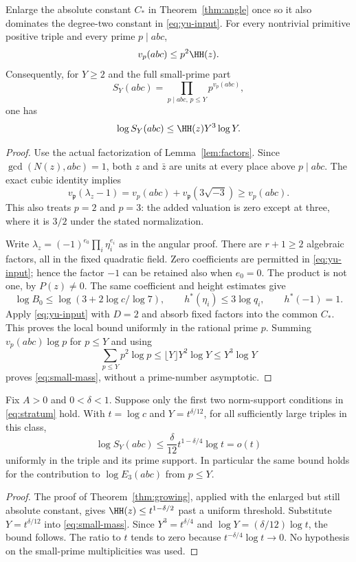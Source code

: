 \begin{theorem}\label{thm:adic-local}
Enlarge the absolute constant $C_*$ in Theorem~\ref{thm:angle} once so it also dominates the degree-two constant in \eqref{eq:yu-input}. For every nontrivial primitive positive triple and every prime $p\mid abc$,
\[
 v_p(abc)\le p^2\HH(z).
\]
Consequently, for $Y\ge2$ and the full small-prime part
\[
 S_Y(abc)=\prod_{p\mid abc,\,p\le Y}p^{v_p(abc)},
\]
one has
\begin{equation}\label{eq:small-mass}
 \log S_Y(abc)\le \HH(z)Y^3\log Y.
\end{equation}
\end{theorem}
\begin{proof}
Use the actual factorization of Lemma~\ref{lem:factors}. Since $\gcd(N(z),abc)=1$, both $z$ and $\bar z$ are units at every place above $p\mid abc$. The exact cubic identity implies
\[
 v_{\mathfrak p}(\lambda_z-1)
  =v_p(abc)+v_{\mathfrak p}(3\sqrt{-3})
  \ge v_p(abc).
\]
This also treats $p=2$ and $p=3$: the added valuation is zero except at three, where it is $3/2$ under the stated normalization.

Write $\lambda_z=(-1)^{e_0}\prod_i\eta_i^{e_i}$ as in the angular proof. There are $r+1\ge2$ algebraic factors, all in the fixed quadratic field. Zero coefficients are permitted in \eqref{eq:yu-input}; hence the factor $-1$ can be retained also when $e_0=0$. The product is not one, by $P(z)\ne0$. The same coefficient and height estimates give
\[
 \log B_0\le\log(3+2\log c/\log7),\qquad
 h^*(\eta_i)\le3\log q_i,\qquad h^*(-1)=1.
\]
Apply \eqref{eq:yu-input} with $D=2$ and absorb fixed factors into the common $C_*$. This proves the local bound uniformly in the rational prime $p$. Summing $v_p(abc)\log p$ for $p\le Y$ and using
\[
 \sum_{p\le Y}p^2\log p\le \lfloor Y\rfloor Y^2\log Y\le Y^3\log Y
\]
proves \eqref{eq:small-mass}, without a prime-number asymptotic.
\end{proof}

\begin{corollary}\label{cor:small-free}
Fix $A>0$ and $0<\delta<1$. Suppose only the first two norm-support conditions in \eqref{eq:stratum} hold. With $t=\log c$ and $Y=t^{\delta/12}$, for all sufficiently large triples in this class,
\[
 \log S_Y(abc)\le \frac{\delta}{12}
            t^{1-\delta/4}\log t=o(t)
\]
uniformly in the triple and its prime support. In particular the same bound holds for the contribution to $\log E_3(abc)$ from $p\le Y$.
\end{corollary}
\begin{proof}
The proof of Theorem~\ref{thm:growing}, applied with the enlarged but still absolute constant, gives $\HH(z)\le t^{1-\delta/2}$ past a uniform threshold. Substitute $Y=t^{\delta/12}$ into \eqref{eq:small-mass}. Since $Y^3=t^{\delta/4}$ and $\log Y=(\delta/12)\log t$, the bound follows. The ratio to $t$ tends to zero because $t^{-\delta/4}\log t\to0$. No hypothesis on the small-prime multiplicities was used.
\end{proof}

